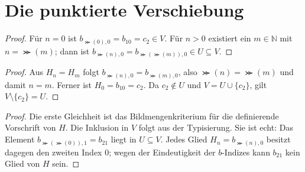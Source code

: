 \documentclass[main.tex]{subfiles}
\begin{document}
\section{Die punktierte Verschiebung}

\begin{proof}
Für \(n=0\) ist \(b_{\Succ(0),0}=b_{10}=c_2\in V\). Für \(n>0\)
existiert ein \(m\in\mathbb N\) mit \(n=\Succ(m)\); dann ist
\(b_{\Succ(n),0}=b_{\Succ(\Succ(m)),0}\in U\subseteq V\).
\end{proof}


\begin{proof}
Aus \(H_n=H_m\) folgt
\(b_{\Succ(n),0}=b_{\Succ(m),0}\), also \(\Succ(n)=\Succ(m)\) und
damit \(n=m\). Ferner ist \(H_0=b_{10}=c_2\). Da \(c_2\notin U\) und
\(V=U\cup\{c_2\}\), gilt \(V\setminus\{c_2\}=U\).
\end{proof}

\begin{proof}
Die erste Gleichheit ist das Bildmengenkriterium für die definierende
Vorschrift von \(H\). Die Inklusion in \(V\) folgt aus der Typisierung.
Sie ist echt: Das Element \(b_{\Succ(\Succ(0)),1}=b_{21}\) liegt in
\(U\subseteq V\). Jedes Glied \(H_n=b_{\Succ(n),0}\) besitzt dagegen den
zweiten Index \(0\); wegen der Eindeutigkeit der \(b\)-Indizes kann
\(b_{21}\) kein Glied von \(H\) sein.
\end{proof}
\end{document}
